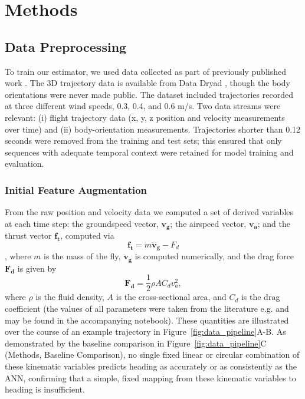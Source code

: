 \documentclass[11pt]{article}
\begin{document}
\section*{Methods}

\subsection*{Data Preprocessing}
To train our estimator, we used data collected as part of previously published work \citep{van2014plume}. The 3D trajectory data is available from Data Dryad \citep{Pang2018}, though the body orientations were never made public. The dataset included trajectories recorded at three different wind speeds, 0.3, 0.4, and 0.6 m/s. Two data streams were relevant: (i) flight trajectory data (x, y, z position and velocity measurements over time) and (ii) body-orientation measurements. Trajectories shorter than 0.12 seconds were removed from the training and test sets; this ensured that only sequences with adequate temporal context were retained for model training and evaluation.


\subsubsection*{Initial Feature Augmentation}
From the raw position and velocity data we computed a set of derived variables at each time step: the groundspeed vector, $\mathbf{v_g}$; the airspeed vector, $\mathbf{v_a}$; and the thrust vector $\mathbf{f_t}$, computed via 
\begin{equation*}
    \mathbf{f_t} = m \mathbf{\ddot{v}_g} - F_d 
\end{equation*}, where $m$ is the mass of the fly,  $\mathbf{\ddot{v}_g}$ is computed numerically, and the drag force $\mathbf{F_d}$ is given by 
\begin{equation*}
\mathbf{F_d} = \frac{1}{2}\rho A C_d v_a^2,
\end{equation*}
where $\rho$ is the fluid density, $A$ is the cross-sectional area, and $C_d$ is the drag coefficient (the values of all parameters were taken from the literature e.g. \citep{fry2005aerodynamics} and may be found in the accompanying notebook). These quantities are illustrated over the course of an example trajectory in Figure~\ref{fig:data_pipeline}A-B. As demonstrated by the baseline comparison in Figure~\ref{fig:data_pipeline}C (Methods, Baseline Comparison), no single fixed linear or circular combination of these kinematic variables predicts heading as accurately or as consistently as the ANN, confirming that a simple, fixed mapping from these kinematic variables to heading is insufficient.
\end{document}
